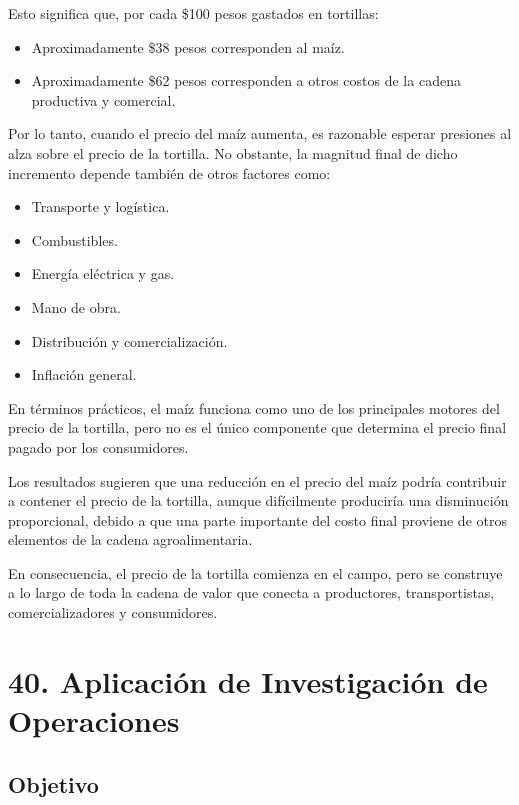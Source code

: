 \documentclass[11pt]{article}
\providecommand{\tightlist}{%
      \setlength{\itemsep}{0pt}\setlength{\parskip}{0pt}}
\begin{document}
Esto significa que, por cada \$100 pesos gastados en tortillas:

\begin{itemize}
\tightlist
\item
  Aproximadamente \$38 pesos corresponden al maíz.
\item
  Aproximadamente \$62 pesos corresponden a otros costos de la cadena
  productiva y comercial.
\end{itemize}

Por lo tanto, cuando el precio del maíz aumenta, es razonable esperar
presiones al alza sobre el precio de la tortilla. No obstante, la
magnitud final de dicho incremento depende también de otros factores
como:

\begin{itemize}
\tightlist
\item
  Transporte y logística.
\item
  Combustibles.
\item
  Energía eléctrica y gas.
\item
  Mano de obra.
\item
  Distribución y comercialización.
\item
  Inflación general.
\end{itemize}

En términos prácticos, el maíz funciona como uno de los principales
motores del precio de la tortilla, pero no es el único componente que
determina el precio final pagado por los consumidores.

Los resultados sugieren que una reducción en el precio del maíz podría
contribuir a contener el precio de la tortilla, aunque difícilmente
produciría una disminución proporcional, debido a que una parte
importante del costo final proviene de otros elementos de la cadena
agroalimentaria.

En consecuencia, el precio de la tortilla comienza en el campo, pero se
construye a lo largo de toda la cadena de valor que conecta a
productores, transportistas, comercializadores y consumidores.

    \hypertarget{aplicaciuxf3n-de-investigaciuxf3n-de-operaciones}{%
\section{40. Aplicación de Investigación de
Operaciones}\label{aplicaciuxf3n-de-investigaciuxf3n-de-operaciones}}

\hypertarget{objetivo}{%
\subsection{Objetivo}\label{objetivo}}
\end{document}
